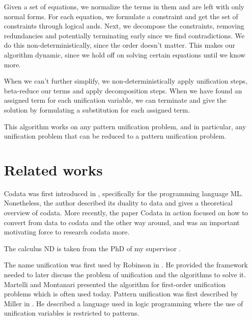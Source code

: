 \documentclass[twoside,12pt,a4paper]{article}
\begin{document}
Given a set of equations, we normalize the terms in them and are left with only normal forms. 
For each equation, we formulate a constraint and get the set of constraints through logical ands.
Next, we decompose the constraints, removing redundancies and potentially terminating early since we find contradictions.
We do this non-deterministically, since the order doesn't matter. %
This makes our algorithm dynamic, since we hold off on solving certain equations until we know more.

When we can't further simplify, we non-deterministically apply unification steps, beta-reduce our terms and apply decomposition steps.
When we have found an assigned term for each unification variable, we can terminate and give the solution
by formulating a substitution for each assigned term.

This algorithm works on any pattern unification problem, and in particular, any unification problem that can be reduced to a pattern unification problem. %

\section{Related works}\label{sec:Related works}

Codata was first introduced in \cite{HAGINO1989629}, specifically for the programming language ML.
Nonetheless, the author described its duality to data and gives a theoretical overview of codata. %
More recently, the paper Codata in action \cite{10.1007/978-3-030-17184-1_5} 
focused on how to convert from data to codata and the other way around, 
and was an important motivating force to research codata more.

The calculus ND is taken from the PhD of my supervisor \cite{binder2024programming}.

The name unification was first used by Robinson in \cite{10.1145/321250.321253}. 
He provided the framework needed to later discuss the problem of unification and the algorithms to solve it.
Martelli and Montanari \cite{10.1145/357162.357169} presented the algorithm for first-order unification problems
which is often used today. 
Pattern unification was first described by Miller in \cite{10.1093/logcom/1.4.497}.
He described a language used in logic programming where the use of unification variables is restricted to patterns.
\end{document}

